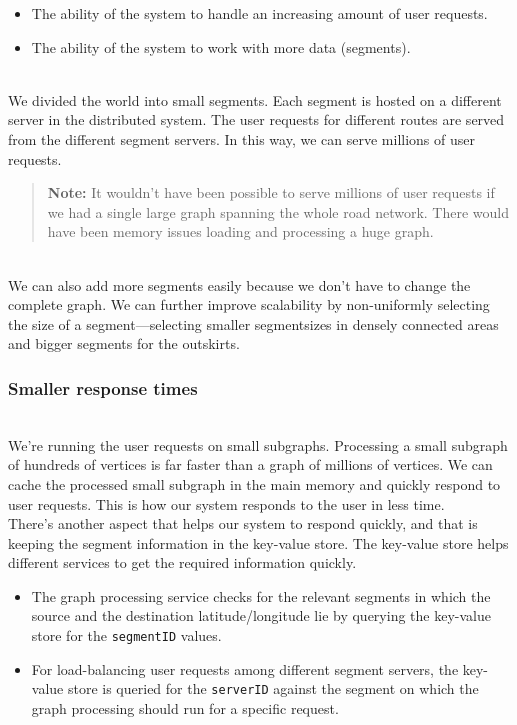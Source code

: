 \begin{itemize}
\item
\protect{}\label{L2DTM2R-ZHPVTDG8uP8HQ}
The ability of the system to handle an increasing amount of user requests.
\item
\protect{}\label{3z5BTCZBbu7GjpTES1TjI}
The ability of the system to work with more data (segments).
\end{itemize}
\\
We divided the world into small segments. Each segment is hosted on a different server in the distributed system. The user requests for different routes are served from the different segment servers. In this way, we can serve millions of user requests.
\begin{quote}
\textbf{Note:} It wouldn't have been possible to serve millions of user requests if we had a single large graph spanning the whole road network. There would have been memory issues loading and processing a huge graph.
\end{quote}
\\
We can also add more segments easily because we don't have to change the complete graph. We can further improve scalability by non-uniformly selecting the size of a segment---selecting smaller segmentsizes in densely connected areas and bigger segments for the outskirts.

\subsubsection{Smaller response times}\label{bS3Cj03idaQKv7_kRwWql}
\\
We're running the user requests on small subgraphs. Processing a small subgraph of hundreds of vertices is far faster than a graph of millions of vertices. We can cache the processed small subgraph in the main memory and quickly respond to user requests. This is how our system responds to the user in less time.
\\
There's another aspect that helps our system to respond quickly, and that is keeping the segment information in the key-value store. The key-value store helps different services to get the required information quickly.

\begin{itemize}
\item
\protect{}\label{8_pw5JsnoKB4Hx6FS_m-C}
The graph processing service checks for the relevant segments in which the source and the destination latitude/longitude lie by querying the key-value store for the \texttt{segmentID} values.
\item
\protect{}\label{Zi5p7CaqhNmliQuVrwNJb}
For load-balancing user requests among different segment servers, the key-value store is queried for the \texttt{serverID} against the segment on which the graph processing should run for a specific request.
\end{itemize}

